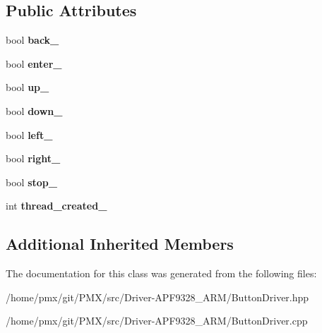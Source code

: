 \subsection*{Public Attributes}
\begin{DoxyCompactItemize}
\item 
\mbox{\label{classButtonDriver_a654e093ddf9b4d2e14d4621392803c7d}} 
bool {\bfseries back\+\_\+}
\item 
\mbox{\label{classButtonDriver_a4557dbb5ab1da2ac7efd1d002552a981}} 
bool {\bfseries enter\+\_\+}
\item 
\mbox{\label{classButtonDriver_a5315bf1d390d8758d477f2c6199cba7e}} 
bool {\bfseries up\+\_\+}
\item 
\mbox{\label{classButtonDriver_adccdba49592a72cc6a9386a176966e83}} 
bool {\bfseries down\+\_\+}
\item 
\mbox{\label{classButtonDriver_af1f6e1519607dfea45da9f9fbb47000d}} 
bool {\bfseries left\+\_\+}
\item 
\mbox{\label{classButtonDriver_a29c2ab016aaea30be0c1c122ce7e543f}} 
bool {\bfseries right\+\_\+}
\item 
\mbox{\label{classButtonDriver_a91f4dc61a9f23814f5057389055da1ac}} 
bool {\bfseries stop\+\_\+}
\item 
\mbox{\label{classButtonDriver_aaa72b659bc63436d5d876b24caf5bf55}} 
int {\bfseries thread\+\_\+created\+\_\+}
\end{DoxyCompactItemize}
\subsection*{Additional Inherited Members}


The documentation for this class was generated from the following files\+:\begin{DoxyCompactItemize}
\item 
/home/pmx/git/\+P\+M\+X/src/\+Driver-\/\+A\+P\+F9328\+\_\+\+A\+R\+M/Button\+Driver.\+hpp\item 
/home/pmx/git/\+P\+M\+X/src/\+Driver-\/\+A\+P\+F9328\+\_\+\+A\+R\+M/Button\+Driver.\+cpp\end{DoxyCompactItemize}
